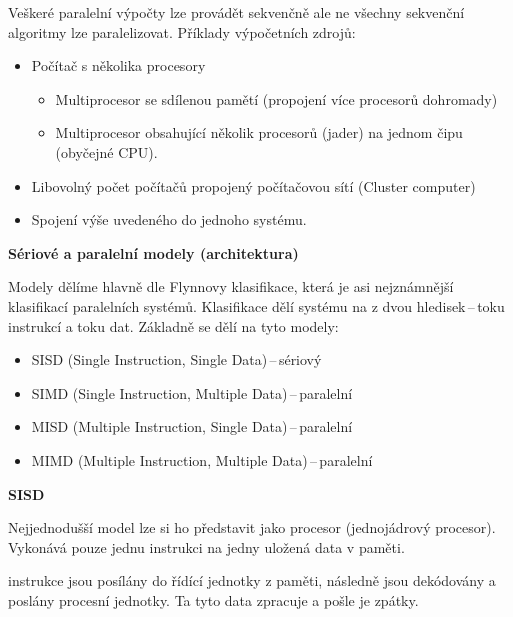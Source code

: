 Veškeré paralelní výpočty lze provádět sekvenčně ale ne všechny sekvenční algoritmy lze paralelizovat.
\vspace{0,3cm}
Příklady výpočetních zdrojů:
\begin{itemize}
    \item Počítač s několika procesory
    \begin{itemize}
        \item Multiprocesor se sdílenou pamětí (propojení více procesorů dohromady)
        \item Multiprocesor obsahující několik procesorů (jader) na jednom čipu (obyčejné CPU).
    \end{itemize}
    \item Libovolný počet počítačů propojený počítačovou sítí (Cluster computer)
    \item Spojení výše uvedeného do jednoho systému. 
\end{itemize}

\begin{Large}\vspace{0,5cm} \textbf{Sériové a paralelní modely (architektura)}
\end{Large}

Modely dělíme hlavně dle Flynnovy klasifikace, která je asi nejznámnější klasifikací paralelních systémů. Klasifikace dělí systému na z dvou hledisek\,--\,toku instrukcí a toku dat. Základně se dělí na tyto modely:
\begin{itemize}
    \item SISD (Single Instruction, Single Data)\,--\,sériový
    \item SIMD (Single Instruction, Multiple Data)\,--\,paralelní
    \item MISD (Multiple Instruction, Single Data)\,--\,paralelní
    \item MIMD (Multiple Instruction, Multiple Data)\,--\,paralelní
\end{itemize}

\begin{large}\vspace{0,5cm} \textbf{SISD}
\end{large}

Nejjednodušší model lze si ho představit jako procesor (jednojádrový procesor). Vykonává pouze jednu instrukci na jedny uložená data v paměti.

instrukce jsou posílány do řídící jednotky z paměti, následně jsou dekódovány a poslány procesní jednotky. Ta tyto data zpracuje a pošle je zpátky.

